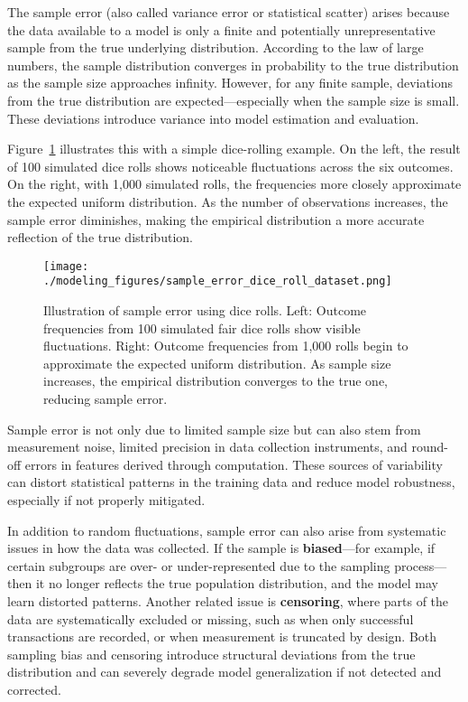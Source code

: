 \documentclass[12pt,openany]{book}
\begin{document}
The sample error (also called variance error or statistical scatter) arises because the data available to a model is only a finite and potentially unrepresentative sample from the true underlying distribution. According to the law of large numbers, the sample distribution converges in probability to the true distribution as the sample size approaches infinity. However, for any finite sample, deviations from the true distribution are expected—especially when the sample size is small. These deviations introduce variance into model estimation and evaluation. \newline

Figure~\ref{fig:sample-error-dice} illustrates this with a simple dice-rolling example. On the left, the result of 100 simulated dice rolls shows noticeable fluctuations across the six outcomes. On the right, with 1,000 simulated rolls, the frequencies more closely approximate the expected uniform distribution. As the number of observations increases, the sample error diminishes, making the empirical distribution a more accurate reflection of the true distribution. \newline

\begin{figure}[H]
    \centering
    \texttt{[image: ./modeling\_figures/sample\_error\_dice\_roll\_dataset.png]}
    \caption{
    Illustration of sample error using dice rolls. Left: Outcome frequencies from 100 simulated fair dice rolls show visible fluctuations. Right: Outcome frequencies from 1,000 rolls begin to approximate the expected uniform distribution. As sample size increases, the empirical distribution converges to the true one, reducing sample error.
    }
    \label{fig:sample-error-dice}
\end{figure}

Sample error is not only due to limited sample size but can also stem from measurement noise, limited precision in data collection instruments, and round-off errors in features derived through computation. These sources of variability can distort statistical patterns in the training data and reduce model robustness, especially if not properly mitigated. \newline

In addition to random fluctuations, sample error can also arise from systematic issues in how the data was collected. If the sample is \textbf{biased}—for example, if certain subgroups are over- or under-represented due to the sampling process—then it no longer reflects the true population distribution, and the model may learn distorted patterns. Another related issue is \textbf{censoring}, where parts of the data are systematically excluded or missing, such as when only successful transactions are recorded, or when measurement is truncated by design. Both sampling bias and censoring introduce structural deviations from the true distribution and can severely degrade model generalization if not detected and corrected.
\end{document}
